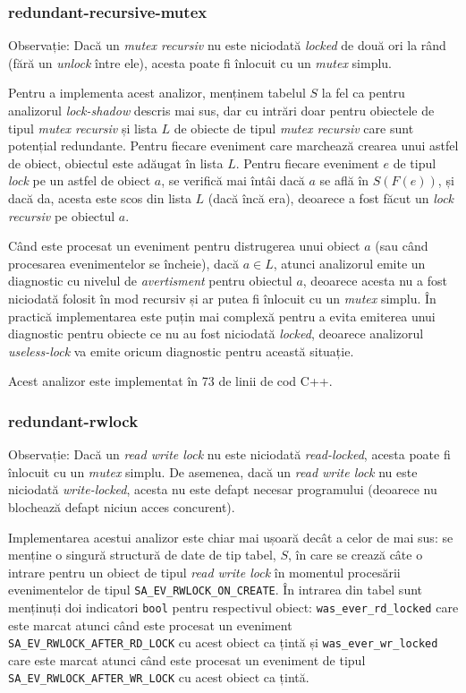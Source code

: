 \subsubsection{redundant-recursive-mutex}

Observație: Dacă un \textit{mutex recursiv} nu este niciodată
\textit{locked} de două ori la rând (fără un \textit{unlock} între ele),
acesta poate fi înlocuit cu un \textit{mutex} simplu.

Pentru a implementa acest analizor, menținem tabelul $S$ la fel ca
pentru analizorul \textit{lock-shadow} descris mai sus, dar cu intrări
doar pentru obiectele de tipul \textit{mutex recursiv} și lista $L$ de
obiecte de tipul \textit{mutex recursiv} care sunt potențial redundante.
Pentru fiecare eveniment care marchează crearea unui astfel de obiect,
obiectul este adăugat în lista $L$. Pentru fiecare eveniment $e$ de
tipul \textit{lock} pe un astfel de obiect $a$, se verifică mai întâi
dacă $a$ se află în $S(F(e))$, și dacă da, acesta este scos din lista
$L$ (dacă încă era), deoarece a fost făcut un \textit{lock recursiv} pe
obiectul $a$.

Când este procesat un eveniment pentru distrugerea unui obiect $a$ (sau
când procesarea evenimentelor se încheie), dacă $a \in L$, atunci
analizorul emite un diagnostic cu nivelul de \textit{avertisment} pentru
obiectul $a$, deoarece acesta nu a fost niciodată folosit în mod
recursiv și ar putea fi înlocuit cu un \textit{mutex} simplu. În
practică implementarea este puțin mai complexă pentru a evita emiterea
unui diagnostic pentru obiecte ce nu au fost niciodată \textit{locked},
deoarece analizorul \textit{useless-lock} va emite oricum diagnostic
pentru această situație.

Acest analizor este implementat în 73 de linii de cod C++.

\subsubsection{redundant-rwlock}

Observație: Dacă un \textit{read write lock} nu este niciodată
\textit{read-locked}, acesta poate fi înlocuit cu un \textit{mutex}
simplu. De asemenea, dacă un \textit{read write lock} nu este niciodată
\textit{write-locked}, acesta nu este defapt necesar programului
(deoarece nu blochează defapt niciun acces concurent).

Implementarea acestui analizor este chiar mai ușoară decât a celor de
mai sus: se menține o singură structură de date de tip tabel, $S$, în
care se crează câte o intrare pentru un obiect de tipul
\textit{read write lock} în momentul procesării evenimentelor de tipul
\lstinline{SA_EV_RWLOCK_ON_CREATE}. În intrarea din tabel sunt menținuți
doi indicatori \lstinline{bool} pentru respectivul obiect:
\lstinline{was_ever_rd_locked} care este marcat atunci
când este procesat un eveniment \lstinline{SA_EV_RWLOCK_AFTER_RD_LOCK}
cu acest obiect ca țintă și \lstinline{was_ever_wr_locked} care este
marcat atunci când este procesat un eveniment de tipul
\lstinline{SA_EV_RWLOCK_AFTER_WR_LOCK} cu acest obiect ca țintă.

